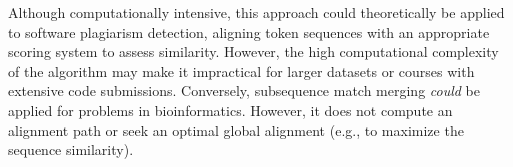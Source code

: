 Although computationally intensive, this approach could theoretically be applied to software plagiarism detection, aligning token sequences with an appropriate scoring system to assess similarity. However, the high computational complexity of the algorithm may make it impractical for larger datasets or courses with extensive code submissions.
%
Conversely, subsequence match merging \textit{could} be applied for problems in bioinformatics.
However, it does not compute an alignment path or seek an optimal global alignment (e.g., to maximize the sequence similarity).
